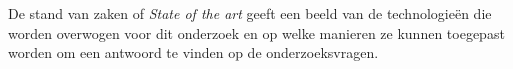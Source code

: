 \chapter{}
\label{ch:stand-van-zaken}







De stand van zaken of \textit{State of the art} geeft een beeld van de technologieën die worden overwogen voor dit onderzoek en op welke manieren ze kunnen toegepast worden om een antwoord te vinden op de onderzoeksvragen.

